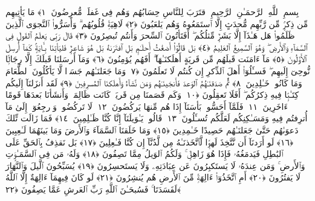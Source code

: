 
  
    
  
    
    

\nopagebreak
  بِسمِ ٱللَّهِ ٱلرَّحمَـٰنِ ٱلرَّحِيمِ
  ٱقتَرَبَ لِلنَّاسِ حِسَابُهُم وَهُم فِى غَفلَةٍۢ مُّعرِضُونَ ﴿١﴾
 مَا يَأتِيهِم مِّن ذِكرٍۢ مِّن رَّبِّهِم مُّحدَثٍ إِلَّا ٱستَمَعُوهُ وَهُم يَلعَبُونَ ﴿٢﴾
 لَاهِيَةًۭ قُلُوبُهُم ۗ وَأَسَرُّوا۟ ٱلنَّجوَى ٱلَّذِينَ ظَلَمُوا۟ هَل هَـٰذَآ إِلَّا بَشَرٌۭ مِّثلُكُم ۖ أَفَتَأتُونَ ٱلسِّحرَ وَأَنتُم تُبصِرُونَ ﴿٣﴾
 قَالَ رَبِّى يَعلَمُ ٱلقَولَ فِى ٱلسَّمَآءِ وَٱلأَرضِ ۖ وَهُوَ ٱلسَّمِيعُ ٱلعَلِيمُ ﴿٤﴾
 بَل قَالُوٓا۟ أَضغَٰثُ أَحلَـٰمٍۭ بَلِ ٱفتَرَىٰهُ بَل هُوَ شَاعِرٌۭ فَليَأتِنَا بِـَٔايَةٍۢ كَمَآ أُرسِلَ ٱلأَوَّلُونَ ﴿٥﴾
 مَآ ءَامَنَت قَبلَهُم مِّن قَريَةٍ أَهلَكنَـٰهَآ ۖ أَفَهُم يُؤمِنُونَ ﴿٦﴾
 وَمَآ أَرسَلنَا قَبلَكَ إِلَّا رِجَالًۭا نُّوحِىٓ إِلَيهِم ۖ فَسـَٔلُوٓا۟ أَهلَ ٱلذِّكرِ إِن كُنتُم لَا تَعلَمُونَ ﴿٧﴾
 وَمَا جَعَلنَـٰهُم جَسَدًۭا لَّا يَأكُلُونَ ٱلطَّعَامَ وَمَا كَانُوا۟ خَـٰلِدِينَ ﴿٨﴾
 ثُمَّ صَدَقنَـٰهُمُ ٱلوَعدَ فَأَنجَينَـٰهُم وَمَن نَّشَآءُ وَأَهلَكنَا ٱلمُسرِفِينَ ﴿٩﴾
 لَقَد أَنزَلنَآ إِلَيكُم كِتَـٰبًۭا فِيهِ ذِكرُكُم ۖ أَفَلَا تَعقِلُونَ ﴿١٠﴾
 وَكَم قَصَمنَا مِن قَريَةٍۢ كَانَت ظَالِمَةًۭ وَأَنشَأنَا بَعدَهَا قَومًا ءَاخَرِينَ ﴿١١﴾
 فَلَمَّآ أَحَسُّوا۟ بَأسَنَآ إِذَا هُم مِّنهَا يَركُضُونَ ﴿١٢﴾
 لَا تَركُضُوا۟ وَٱرجِعُوٓا۟ إِلَىٰ مَآ أُترِفتُم فِيهِ وَمَسَـٰكِنِكُم لَعَلَّكُم تُسـَٔلُونَ ﴿١٣﴾
 قَالُوا۟ يَـٰوَيلَنَآ إِنَّا كُنَّا ظَـٰلِمِينَ ﴿١٤﴾
 فَمَا زَالَت تِّلكَ دَعوَىٰهُم حَتَّىٰ جَعَلنَـٰهُم حَصِيدًا خَـٰمِدِينَ ﴿١٥﴾
 وَمَا خَلَقنَا ٱلسَّمَآءَ وَٱلأَرضَ وَمَا بَينَهُمَا لَـٰعِبِينَ ﴿١٦﴾
 لَو أَرَدنَآ أَن نَّتَّخِذَ لَهوًۭا لَّٱتَّخَذنَـٰهُ مِن لَّدُنَّآ إِن كُنَّا فَـٰعِلِينَ ﴿١٧﴾
 بَل نَقذِفُ بِٱلحَقِّ عَلَى ٱلبَٰطِلِ فَيَدمَغُهُۥ فَإِذَا هُوَ زَاهِقٌۭ ۚ وَلَكُمُ ٱلوَيلُ مِمَّا تَصِفُونَ ﴿١٨﴾
 وَلَهُۥ مَن فِى ٱلسَّمَـٰوَٟتِ وَٱلأَرضِ ۚ وَمَن عِندَهُۥ لَا يَستَكبِرُونَ عَن عِبَادَتِهِۦ وَلَا يَستَحسِرُونَ ﴿١٩﴾
 يُسَبِّحُونَ ٱلَّيلَ وَٱلنَّهَارَ لَا يَفتُرُونَ ﴿٢٠﴾
 أَمِ ٱتَّخَذُوٓا۟ ءَالِهَةًۭ مِّنَ ٱلأَرضِ هُم يُنشِرُونَ ﴿٢١﴾
 لَو كَانَ فِيهِمَآ ءَالِهَةٌ إِلَّا ٱللَّهُ لَفَسَدَتَا ۚ فَسُبحَـٰنَ ٱللَّهِ رَبِّ ٱلعَرشِ عَمَّا يَصِفُونَ ﴿٢٢﴾
